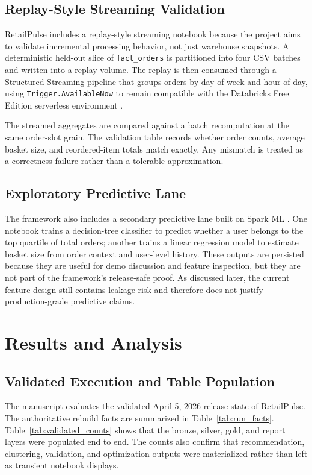 \documentclass[journal]{IEEEtran}
\begin{document}
\subsection{Replay-Style Streaming Validation}
RetailPulse includes a replay-style streaming notebook because the project aims to validate incremental processing behavior, not just warehouse snapshots. A deterministic held-out slice of \texttt{fact\_orders} is partitioned into four CSV batches and written into a replay volume. The replay is then consumed through a Structured Streaming pipeline that groups orders by day of week and hour of day, using \texttt{Trigger.AvailableNow} to remain compatible with the Databricks Free Edition serverless environment \cite{armbrust2018structured,databricks_streaming}.

The streamed aggregates are compared against a batch recomputation at the same order-slot grain. The validation table records whether order counts, average basket size, and reordered-item totals match exactly. Any mismatch is treated as a correctness failure rather than a tolerable approximation.

\subsection{Exploratory Predictive Lane}
The framework also includes a secondary predictive lane built on Spark ML \cite{spark_ml}. One notebook trains a decision-tree classifier to predict whether a user belongs to the top quartile of total orders; another trains a linear regression model to estimate basket size from order context and user-level history. These outputs are persisted because they are useful for demo discussion and feature inspection, but they are not part of the framework's release-safe proof. As discussed later, the current feature design still contains leakage risk and therefore does not justify production-grade predictive claims.

\section{Results and Analysis}
\subsection{Validated Execution and Table Population}
The manuscript evaluates the validated April 5, 2026 release state of RetailPulse. The authoritative rebuild facts are summarized in Table~\ref{tab:run_facts}. Table~\ref{tab:validated_counts} shows that the bronze, silver, gold, and report layers were populated end to end. The counts also confirm that recommendation, clustering, validation, and optimization outputs were materialized rather than left as transient notebook displays.
\end{document}
